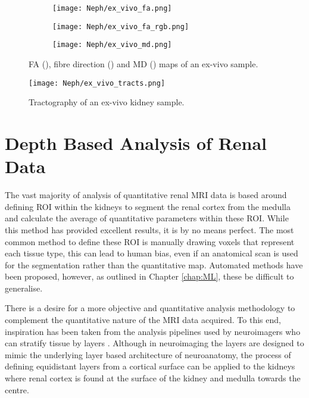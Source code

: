 \begin{figure}[H]
	\centering
	\begin{subfigure}[c]{0.31\textwidth}
		\centering
		\texttt{[image: Neph/ex\_vivo\_fa.png]} %
		\caption{}
		\label{fig:ex_ex_dti_fa}
	\end{subfigure}
	\hfill
	\begin{subfigure}[c]{0.31\textwidth}
		\centering
		\texttt{[image: Neph/ex\_vivo\_fa\_rgb.png]} %
		\caption{}
		\label{fig:ex_ex_dti_fa_rgb}
	\end{subfigure}
	\hfill	
	\begin{subfigure}[c]{0.31\textwidth}
		\centering
		\texttt{[image: Neph/ex\_vivo\_md.png]} %
		\caption{}
		\label{fig:ex_ex_dti_md}
	\end{subfigure}
	\caption{\ac{FA} (), fibre direction () and \ac{MD} () maps of an ex-vivo sample.}
	\label{fig:ex_ex_dti_maps}
\end{figure}

\begin{figure}[H]
	\centering
	\texttt{[image: Neph/ex\_vivo\_tracts.png]} %
	\caption{Tractography of an ex-vivo kidney sample.}
	\label{fig:ex_ex_tracts}	
\end{figure}

\newpage

\section{Depth Based Analysis of Renal Data}
\label{sec:ex_layers}
The vast majority of analysis of quantitative renal \ac{MRI} data is based around defining \ac{ROI} within the kidneys to segment the renal cortex from the medulla and calculate the average of quantitative parameters within these \ac{ROI}. While this method has provided excellent results, it is by no means perfect. The most common method to define these \ac{ROI} is manually drawing voxels that represent each tissue type, this can lead to human bias, even if an anatomical scan is used for the segmentation rather than the quantitative map. Automated methods have been proposed, however, as outlined in Chapter \ref{chap:ML}, these be difficult to generalise.

There is a desire for a more objective and quantitative analysis methodology to complement the quantitative nature of the \ac{MRI} data acquired. To this end, inspiration has been taken from the analysis pipelines used by neuroimagers who can stratify tissue by layers \cite{self_benchmarking_2019, muckli_contextual_2015, waehnert_anatomically_2014, taso_regional_2021}. Although in neuroimaging the layers are designed to mimic the underlying layer based architecture of neuroanatomy, the process of defining equidistant layers from a cortical surface can be applied to the kidneys where renal cortex is found at the surface of the kidney and medulla towards the centre. 

